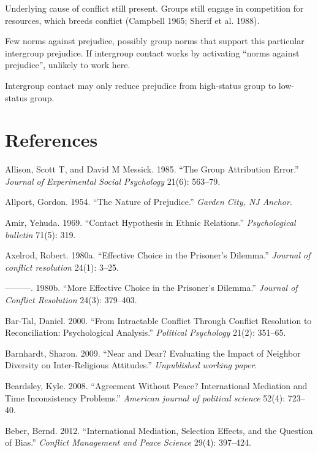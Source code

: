 \documentclass[11pt]{article}
\begin{document}
Underlying cause of conflict still present. Groups still engage in
competition for resources, which breeds conflict (Campbell 1965; Sherif
et al. 1988).

Few norms against prejudice, possibly group norms that support this
particular intergroup prejudice. If intergroup contact works by
activating ``norms against prejudice'', unlikely to work here.

Intergroup contact may only reduce prejudice from high-status group to
low-status group.

\section*{References}\label{references}

\hypertarget{refs}{}
\hypertarget{ref-allison1985group}{}
Allison, Scott T, and David M Messick. 1985. ``The Group Attribution
Error.'' \emph{Journal of Experimental Social Psychology} 21(6):
563--79.

\hypertarget{ref-allport1954prejudice}{}
Allport, Gordon. 1954. ``The Nature of Prejudice.'' \emph{Garden City,
NJ Anchor}.

\hypertarget{ref-amir1969contact}{}
Amir, Yehuda. 1969. ``Contact Hypothesis in Ethnic Relations.''
\emph{Psychological bulletin} 71(5): 319.

\hypertarget{ref-axelrod1980effective}{}
Axelrod, Robert. 1980a. ``Effective Choice in the Prisoner's Dilemma.''
\emph{Journal of conflict resolution} 24(1): 3--25.

\hypertarget{ref-axelrod1980more}{}
---------. 1980b. ``More Effective Choice in the Prisoner's Dilemma.''
\emph{Journal of Conflict Resolution} 24(3): 379--403.

\hypertarget{ref-bar2000intractable}{}
Bar-Tal, Daniel. 2000. ``From Intractable Conflict Through Conflict
Resolution to Reconciliation: Psychological Analysis.'' \emph{Political
Psychology} 21(2): 351--65.

\hypertarget{ref-barnhardt2009near}{}
Barnhardt, Sharon. 2009. ``Near and Dear? Evaluating the Impact of
Neighbor Diversity on Inter-Religious Attitudes.'' \emph{Unpublished
working paper}.

\hypertarget{ref-beardsley2008agreement}{}
Beardsley, Kyle. 2008. ``Agreement Without Peace? International
Mediation and Time Inconsistency Problems.'' \emph{American journal of
political science} 52(4): 723--40.

\hypertarget{ref-beber2012international}{}
Beber, Bernd. 2012. ``International Mediation, Selection Effects, and
the Question of Bias.'' \emph{Conflict Management and Peace Science}
29(4): 397--424.
\end{document}

